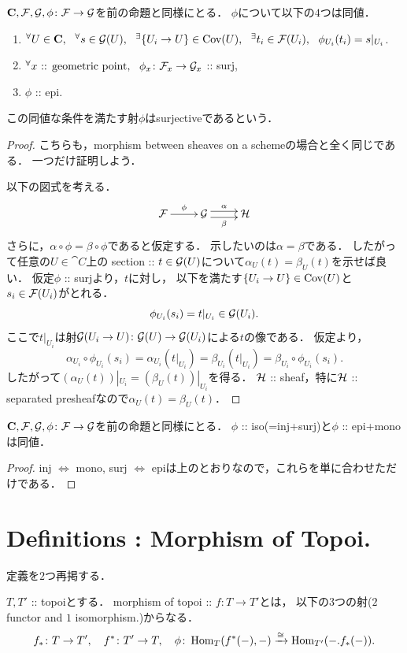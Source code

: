 \documentclass[a4paper]{jsarticle}
\begin{document}
\begin{Prop}\label{prop:surj}
    $\mathbf{C}, \mathcal{F}, \mathcal{G}, \phi \colon \mathcal{F} \to \mathcal{G}$を前の命題と同様にとる．
    $\phi$について以下の$4$つは同値．
    \begin{enumerate}
        \item ${}^{\forall} U \in \mathbf{C},~~ {}^{\forall} s \in \mathcal{G}(U),~~ {}^{\exists} \{U_i \to U\} \in \operatorname{Cov}(U),~~
                {}^{\exists} t_i \in \mathcal{F}(U_i),~~ \phi_{U_i}(t_i)=s|_{U_i}$.
        \item ${}^{\forall} x \text{ :: geometric point},~~ \phi_{x} \colon \mathcal{F}_x \to \mathcal{G}_x$ :: surj,
        \item $\phi$ :: epi.
    \end{enumerate}
    この同値な条件を満たす射$\phi$はsurjectiveであるという．
\end{Prop}
\begin{proof}
    こちらも，morphism between sheaves on a schemeの場合と全く同じである．
    一つだけ証明しよう．

    以下の図式を考える．
    \[\xymatrix{
        \shF \ar[r]^-{\phi}& \shG \ar@<1mm>[r]^-{\alpha} \ar@<-1mm>[r]_-{\beta}& \shH
    }\]
    さらに，$\alpha \circ \phi=\beta \circ \phi$であると仮定する．
    示したいのは$\alpha=\beta$である．
    したがって任意の$U \in \cat{C}$上の
    section :: $t \in \mathcal{G}(U)$について$\alpha_U(t)=\beta_U(t)$を示せば良い．
    仮定$\phi$ :: surjより，$t$に対し，
    以下を満たす$\{U_i \to U\} \in \operatorname{Cov}(U)$と$s_i \in \mathcal{F}(U_i)$がとれる．
    \[ \phi_{U_i}(s_i)=t|_{U_i} \in \mathcal{G}(U_i). \]
    ここで$t|_{U_i}$は射$\mathcal{G}(U_i \to U) \colon \mathcal{G}(U) \to \mathcal{G}(U_i)$による$t$の像である．
    仮定より，
    \[
        \alpha_{U_i} \circ \phi_{U_i}(s_i)
        =\alpha_{U_i}(t|_{U_i})=\beta_{U_i}(t|_{U_i})
        =\beta_{U_i} \circ \phi_{U_i}(s_i).
    \]
    したがって$(\alpha_U(t))|_{U_i}=(\beta_U(t))|_{U_i}$を得る．
    $\mathcal{H}$ :: sheaf，特に$\mathcal{H}$ :: separated presheafなので$\alpha_U(t)=\beta_U(t)$．
\end{proof}

\begin{Prop}
    $\mathbf{C}, \mathcal{F}, \mathcal{G}, \phi \colon \mathcal{F} \to \mathcal{G}$を前の命題と同様にとる．
    $\phi$ :: iso(=inj+surj)と$\phi$ :: epi+monoは同値．
\end{Prop}
\begin{proof}
    inj $\iff$ mono, surj $\iff$ epiは上のとおりなので，これらを単に合わせただけである．
\end{proof}

\section{Definitions : Morphism of Topoi.}
定義を$2$つ再掲する．
\begin{Def}
    $T, T'$ :: topoiとする．
    morphism of topoi :: $f \colon T \to T'$とは，
    以下の$3$つの射($2$ functor and $1$ isomorphism.)からなる．
    \[
        f_* \colon T \to T', \quad f^* \colon T' \to T,
        \quad \phi \colon \operatorname{Hom}_{T}(f^*(-), -) \xrightarrow{\cong} \operatorname{Hom}_{T'}(-. f_*(-)).
    \]
\end{Def}
\end{document}
